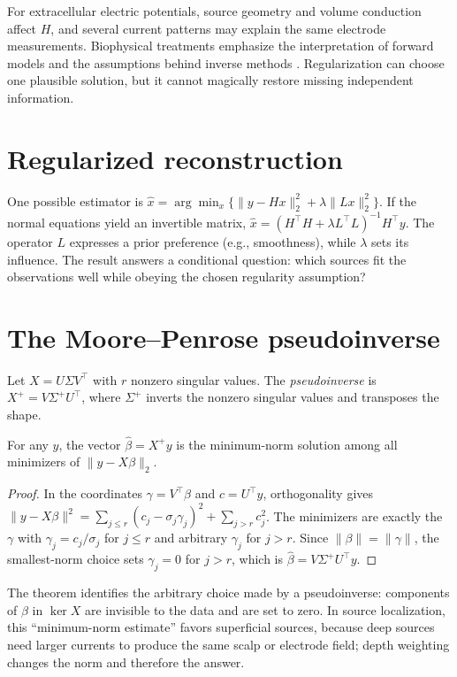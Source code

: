 For extracellular electric potentials, source geometry and volume conduction affect $H$, and several current patterns may explain the same electrode measurements. Biophysical treatments emphasize the interpretation of forward models and the assumptions behind inverse methods \cite{Buzsaki2012,Einevoll2013}. Regularization can choose one plausible solution, but it cannot magically restore missing independent information.

\section{Regularized reconstruction}
One possible estimator is $\hat x=\arg\min_x\{\|y-Hx\|_2^2+\lambda\|Lx\|_2^2\}$. If the normal equations yield an invertible matrix, $\hat x=(H^\top H+\lambda L^\top L)^{-1}H^\top y$. The operator $L$ expresses a prior preference (e.g., smoothness), while $\lambda$ sets its influence. The result answers a conditional question: which sources fit the observations well while obeying the chosen regularity assumption?

\section{The Moore--Penrose pseudoinverse}
Let $X=U\Sigma V^\top$ with $r$ nonzero singular values. The \emph{pseudoinverse} is $X^+=V\Sigma^+U^\top$, where $\Sigma^+$ inverts the nonzero singular values and transposes the shape.

\begin{theorem}
For any $y$, the vector $\hat\beta=X^+y$ is the minimum-norm solution among all minimizers of $\|y-X\beta\|_2$.
\end{theorem}
\begin{proof}
In the coordinates $\gamma=V^\top\beta$ and $c=U^\top y$, orthogonality gives $\|y-X\beta\|^2=\sum_{j\le r}(c_j-\sigma_j\gamma_j)^2+\sum_{j>r}c_j^2$. The minimizers are exactly the $\gamma$ with $\gamma_j=c_j/\sigma_j$ for $j\le r$ and arbitrary $\gamma_j$ for $j>r$. Since $\|\beta\|=\|\gamma\|$, the smallest-norm choice sets $\gamma_j=0$ for $j>r$, which is $\hat\beta=V\Sigma^+U^\top y$.
\end{proof}
The theorem identifies the arbitrary choice made by a pseudoinverse: components of $\beta$ in $\ker X$ are invisible to the data and are set to zero. In source localization, this ``minimum-norm estimate'' favors superficial sources, because deep sources need larger currents to produce the same scalp or electrode field; depth weighting changes the norm and therefore the answer.

